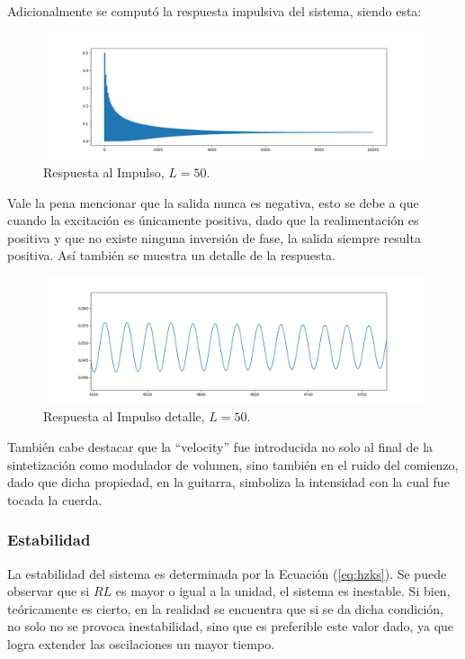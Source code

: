 Adicionalmente se computó la respuesta impulsiva del sistema, siendo esta:
\begin{figure}[H]
	\centering
	\includegraphics[width=\textwidth]{ImagenesEjercicio4/impulseResponse.PNG}
	\caption{Respuesta al Impulso, $L=50$.}
	\label{fig:impulse}
\end{figure}

Vale la pena mencionar que la salida nunca es negativa, esto se debe a que cuando la excitación es únicamente positiva, dado que la realimentación es positiva y que no existe ninguna inversión de fase, la salida siempre resulta positiva. Así también se muestra un detalle de la respuesta.
\begin{figure}[H]
	\centering
	\includegraphics[width=\textwidth]{ImagenesEjercicio4/impulseResponseDETAIL.PNG}
	\caption{Respuesta al Impulso detalle, $L=50$.}
	\label{fig:impulsed}
\end{figure}

También cabe destacar que la ``velocity'' fue introducida no solo al final de la sintetización como modulador de volumen, sino también en el ruido del comienzo, dado que dicha propiedad, en la guitarra, simboliza la intensidad con la cual fue tocada la cuerda.

\subsubsection{Estabilidad}
La estabilidad del sistema es determinada por la Ecuación (\ref{eq:hzks}). Se puede observar que si $RL$ es mayor o igual a la unidad, el sistema es inestable. Si bien, teóricamente es cierto, en la realidad se encuentra que si se da dicha condición, no solo no se provoca inestabilidad, sino que es preferible este valor dado, ya que logra extender las oscilaciones un mayor tiempo.

